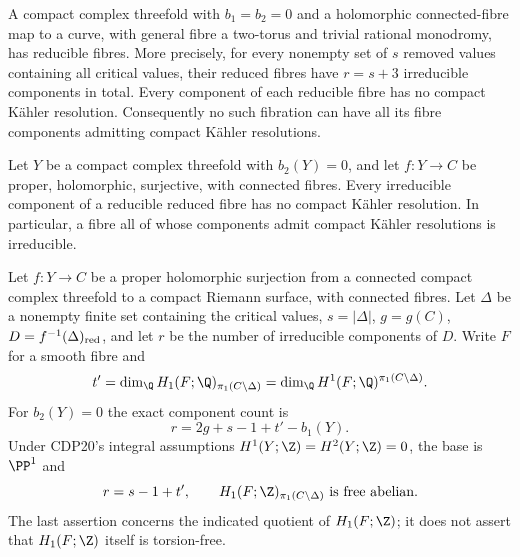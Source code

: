 
\begin{proposition}\hypertarget{tag-01G8}{}\label{cdp:st:D.2.1}


A compact complex threefold with $b_1=b_2=0$ and a holomorphic
connected-fibre map to a curve, with general fibre a two-torus and
trivial rational monodromy, has reducible fibres. More precisely,
for every nonempty set of $s$ removed values containing all critical
values, their reduced fibres have $r=s+3$ irreducible components in
total. Every component of each reducible fibre has no compact
K\"ahler resolution. Consequently no such fibration can have all
its fibre components admitting compact K\"ahler resolutions.
\end{proposition}

\begin{proposition}\hypertarget{tag-01FA}{}\label{cdp:st:C.3.4}


Let $Y$ be a compact complex threefold with $b_2(Y)=0$, and let
$f:Y\to C$ be proper, holomorphic, surjective, with connected fibres.
Every irreducible component of a reducible reduced fibre has no
compact K\"ahler resolution. In particular, a fibre all of whose
components admit compact K\"ahler resolutions is irreducible.
\end{proposition}

\begin{proposition}\hypertarget{tag-01G0}{}\label{cdp:st:D.1.2}


Let $f:Y\to C$ be a proper holomorphic surjection from a connected
compact complex threefold to a compact Riemann surface, with
connected fibres. Let $\Delta$ be a nonempty finite set containing
the critical values, $s=|\Delta|$, $g=g(C)$,
$D=f^{-1}(\Delta)_{\rm red}$, and let $r$ be the number of
irreducible components of $D$. Write $F$ for a smooth fibre and
\[
t'=\dim_{\Q}H_1(F;\Q)_{\pi_1(C\setminus\Delta)}
   =\dim_{\Q}H^1(F;\Q)^{\pi_1(C\setminus\Delta)}.
\]
For $b_2(Y)=0$ the exact component count is
\[
\boxed{\quad r=2g+s-1+t'-b_1(Y).\quad}
\]
Under CDP20's integral assumptions
$H^1(Y;\Z)=H^2(Y;\Z)=0$, the base is $\PP^1$ and
\[
r=s-1+t',\qquad
H_1(F;\Z)_{\pi_1(C\setminus\Delta)}\text{ is free abelian}.
\]
The last assertion concerns the indicated quotient of $H_1(F;\Z)$;
it does not assert that $H_1(F;\Z)$ itself is torsion-free.
\end{proposition}

